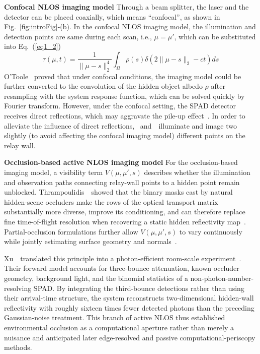 \vspace{0.8mm}
\noindent \textbf{Confocal NLOS imaging model}
Through a beam splitter, the laser and the detector can be placed coaxially, which means “confocal”, as shown in Fig.~\ref{fig:introFig}-(b). In the confocal NLOS imaging model, the illumination and detection points are same during each scan, i.e., $\mu = \mu'$, which can be substituted into Eq.~(\ref{eq1_2})
\begin{equation}
    \tau(\mu,t) =  \frac{1}{\|\mu -s\|_{2}^{4}} \int_{\Omega} \rho(s) \delta(2\|\mu -s\|_{2} -ct) ds
    \label{eq:confocal}
\end{equation}
O'Toole \etal~proved that under confocal conditions, the imaging model could be further converted to the convolution of the hidden object albedo $\rho$ after resampling with the system response function, which can be solved quickly by Fourier transform. However, under the confocal setting, the SPAD detector receives direct reflections, which may aggravate the pile-up effect~\cite{arlt_study_2013}. In order to alleviate the influence of direct reflections, \cite{wuNonLineofsightImaging2021}~and~\cite{otooleConfocalNonlineofsightImaging2018}~illuminate and image two slightly (to avoid affecting the confocal imaging model) different points on the relay wall. 

\vspace{0.8mm}
\noindent \textbf{Occlusion-based active NLOS imaging model}
For the occlusion-based imaging model, a visibility term $V(\mu,\mu',s)$ describes whether the illumination and observation paths connecting relay-wall points to a hidden point remain unblocked. Thrampoulidis~\etal~showed that the binary masks cast by natural hidden-scene occluders make the rows of the optical transport matrix substantially more diverse, improve its conditioning, and can therefore replace fine time-of-flight resolution when recovering a static hidden reflectivity map~\cite{thrampoulidisExploitingOcclusionNonLineofSight2018}. Partial-occlusion formulations further allow $V(\mu,\mu',s)$ to vary continuously while jointly estimating surface geometry and normals~\cite{heideNonlineofsightImagingPartial2017}.

Xu~\etal~translated this principle into a photon-efficient room-scale experiment~\cite{xuPhotonEfficientOcclusion2018}. Their forward model accounts for three-bounce attenuation, known occluder geometry, background light, and the binomial statistics of a non-photon-number-resolving SPAD. By integrating the third-bounce detections rather than using their arrival-time structure, the system reconstructs two-dimensional hidden-wall reflectivity with roughly sixteen times fewer detected photons than the preceding Gaussian-noise treatment. This branch of active NLOS thus established environmental occlusion as a computational aperture rather than merely a nuisance and anticipated later edge-resolved and passive computational-periscopy methods.

